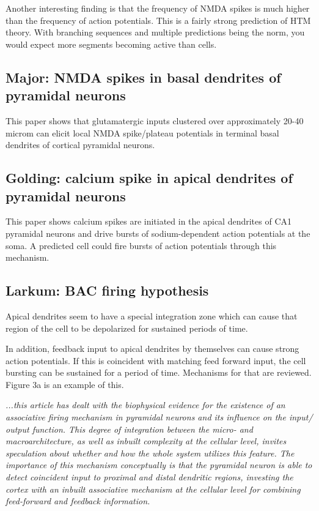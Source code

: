 \documentclass{article} %
\begin{document}
Another interesting finding is that the frequency of NMDA spikes is much higher
than the frequency of action potentials. This is a fairly strong prediction of HTM
theory. With branching sequences and multiple predictions being the norm, you
would expect more segments becoming active than cells.


\subsection{Major: NMDA spikes in basal dendrites of pyramidal neurons}

This paper \cite{Major2008} shows that glutamatergic inputs clustered over 
approximately 20-40 microm can elicit local NMDA spike/plateau potentials in 
terminal basal dendrites of cortical pyramidal neurons.

\subsection{Golding: calcium spike in apical dendrites of pyramidal neurons}

This paper \cite{Golding1999} shows calcium spikes are initiated in the apical 
dendrites of CA1 pyramidal neurons and drive bursts of sodium-dependent action 
potentials at the soma. A predicted cell could fire bursts of action potentials 
through this mechanism. 

\subsection{Larkum: BAC firing hypothesis}

Apical dendrites seem to have a special integration zone which can cause that
region of the cell to be depolarized for sustained periods of time.

In addition, feedback input to apical dendrites by themselves can cause strong
action potentials.   If this is coincident with matching feed forward input, the
cell bursting can be sustained for a period of time. Mechanisms for that are
reviewed. Figure 3a is an example of this.

\emph{
...this article \cite{Larkum2013} has dealt with the biophysical
evidence for the existence of an associative firing mechanism in pyramidal
neurons and its influence on the input/ output function. This degree of
integration between the micro- and macroarchitecture, as well as inbuilt
complexity at the cellular level, invites speculation about whether and how the
whole system utilizes this feature. The importance of this mechanism
conceptually is that the pyramidal neuron is able to detect coincident input to
proximal and distal dendritic regions, investing the cortex with an inbuilt
associative mechanism at the cellular level for combining feed-forward and
feedback information.}
\end{document}
